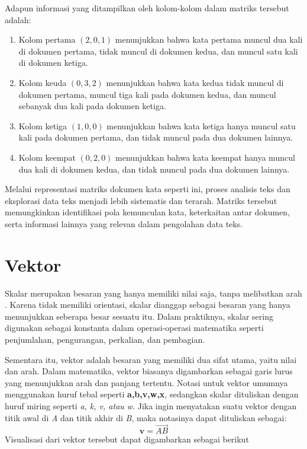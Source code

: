 \documentclass[a4paper,12pt]{report}
\numberwithin{equation}{chapter}
\begin{document}
Adapun informasi yang ditampilkan oleh kolom-kolom dalam matriks tersebut adalah:
\begin{enumerate}
    \item Kolom pertama $(2,0,1)$ menunjukkan bahwa kata pertama muncul dua kali di dokumen pertama, tidak muncul di dokumen kedua, dan muncul satu kali di dokumen ketiga.
    \item Kolom keuda $(0,3,2)$ menunjukkan bahwa kata kedua tidak muncul di dokumen pertama, muncul tiga kali pada dokumen kedua, dan muncul sebanyak dua kali pada dokumen ketiga.
    \item Kolom ketiga $(1,0,0)$ menunjukkan bahwa kata ketiga hanya muncul satu kali pada dokumen pertama, dan tidak muncul pada dua dokumen lainnya.
    \item Kolom keempat $(0,2,0)$ menunjukkan bahwa kata keempat hanya muncul dua kali di dokumen kedua, dan tidak muncul pada dua dokumen lainnya.
\end{enumerate}

Melalui representasi matriks dokumen kata seperti ini, proses analisis teks dan eksplorasi data teks menjadi lebih sistematis dan terarah. Matriks tersebut memungkinkan identifikasi pola kemunculan kata, keterkaitan antar dokumen, serta informasi lainnya yang relevan dalam pengolahan data teks.


 \section{Vektor}
Skalar merupakan besaran yang hanya memiliki nilai saja, tanpa melibatkan arah \citep{Anton2014ElementaryAlgebra}. Karena tidak memiliki orientasi, skalar dianggap sebagai besaran yang hanya menunjukkan seberapa besar sesuatu itu. Dalam praktiknya, skalar sering digunakan sebagai konstanta dalam operasi-operasi matematika seperti penjumlahan, pengurangan, perkalian, dan pembagian.

Sementara itu, vektor adalah besaran yang memiliki dua sifat utama, yaitu nilai dan arah. Dalam matematika, vektor biasanya digambarkan sebagai garis lurus yang menunjukkan arah dan panjang tertentu. Notasi untuk vektor umumnya menggunakan huruf tebal seperti \textbf{a,b,v,w,x}, sedangkan skalar dituliskan dengan huruf miring seperti \textit{a, k, v, atau w}.  Jika ingin menyatakan suatu vektor dengan titik awal di \textit{A} dan titik akhir di \textit{B}, maka notasinya dapat dituliskan sebagai:
\[
    \textbf{v}=\overrightarrow{AB}
\]
Visualisasi dari vektor tersebut dapat digambarkan sebagai berikut
\end{document}
